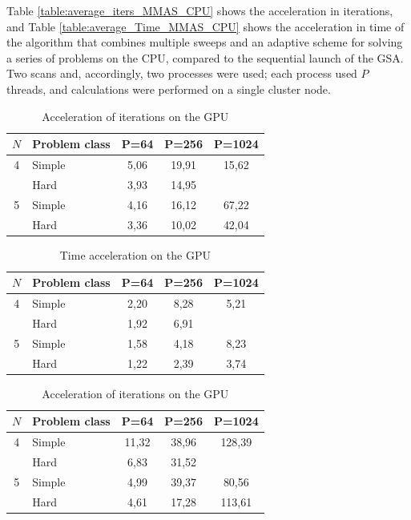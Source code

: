 \documentclass{svproc}
\begin{document}
   Table \ref{table:average_iters_MMAS_CPU} shows the acceleration in iterations, and Table \ref{table:average_Time_MMAS_CPU} shows the acceleration in time of the algorithm that combines multiple sweeps and an adaptive scheme for solving a series of problems on the CPU, compared to the sequential launch of the GSA. Two scans and, accordingly, two processes were used; each process used $P$ threads, and calculations were performed on a single cluster node.

\begin{table}
    \centering
    \begin{tabular}{|c|p{3cm}|c|c|c|}
    \hline
    \(N\) & Problem class & P=64 & P=256 & P=1024 \\ \hline
    4 & Simple &   5,06 & 19,91 & 15,62  \\ \cline{2-5}
      & Hard   &   3,93 & 14,95 &   \\ \hline
    5 & Simple &   4,16 & 16,12 & 67,22  \\ \cline{2-5}
      & Hard   &   3,36 & 10,02 & 42,04   \\ \hline
    \end{tabular}
    \caption{Acceleration of iterations on the GPU}
    \label{table:average_iters_AS_GPU}
\end{table}

\begin{table}
    \centering
    \begin{tabular}{|c|p{3cm}|c|c|c|}
    \hline
    \(N\) & Problem class & P=64 & P=256 & P=1024 \\ \hline
    4 & Simple &   2,20 & 8,28 & 5,21  \\ \cline{2-5}
      & Hard   &   1,92 & 6,91 &   \\ \hline
    5 & Simple &   1,58 & 4,18 & 8,23  \\ \cline{2-5}
      & Hard   &   1,22 & 2,39 & 3,74   \\ \hline
    \end{tabular}
    \caption{Time acceleration on the GPU}
    \label{table:average_Time_AS_GPU}
\end{table}

\begin{table}
    \centering
    \begin{tabular}{|c|p{3cm}|c|c|c|}
    \hline
    \(N\) & Problem class & P=64 & P=256 & P=1024 \\ \hline
    4 & Simple &   11,32 & 38,96 & 128,39  \\ \cline{2-5}
      & Hard   &   6,83  & 31,52 &   \\ \hline
    5 & Simple &   4,99  & 39,37 & 80,56  \\ \cline{2-5}
      & Hard   &   4,61  & 17,28 & 113,61   \\ \hline
    \end{tabular}
    \caption{Acceleration of iterations on the GPU}
    \label{table:average_iters_MMAS_GPU}
\end{table}
\end{document}
